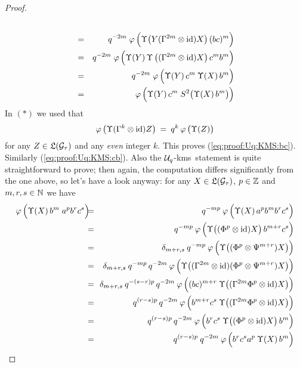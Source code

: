 \begin{proof}
\begin{eqnarray*}
\\ &=&
q^{-2m}\; \varphi\left(\Upsilon \!\left(Y (\Gamma^{2m} \tens \id) X \right) (bc)^m \vertL \right)
\\ &=&
q^{-2m}\; \varphi\left(\Upsilon(Y) \, \Upsilon
       \left((\Gamma^{2m} \tens \id) X \right) c^m b^m \vertL\right)
\\ &=&
q^{-2m}\; \varphi\left(\Upsilon(Y)\, c^m \: \Upsilon(X)\, b^m \vertL\right)
\\ &=&
\varphi\left(\Upsilon(Y)\,c^m\;
        S^2\!\left(\Upsilon(X)\,b^m \vertM \right) \! \vertL\right)
\end{eqnarray*}
In $(*)$ we used that
$$ \varphi \left(\Upsilon(\Gamma^k \tens \id)Z\vertM\right)
        \:=\: q^k \,\varphi\left(\Upsilon(Z)\vertM\right) $$
for any $Z \in \mathfrak{L}(\mathcal G_\tau)$ and any {\em even\/} integer $k$.
This proves (\ref{eq:proof:Uq:KMS:bc}). Similarly (\ref{eq:proof:Uq:KMS:cb}).
Also the ${\mathcal U}_q$-{\sc kms}\ statement is quite straight\-forward to prove;
then again, the computation differs significantly from the one above,
so let's have a look anyway:
for any $X \in \mathfrak{L}(\mathcal G_\tau)$, $p \in \mathbb{Z}$ and $m,r,s \in \mathbb{N}$ we have
\begin{eqnarray*}
\varphi\left(\Upsilon(X)\, b^m \; a^p b^r c^s \vertL \right)
\!\!\!&=\!\!&
q^{-mp} \: \varphi\left(\Upsilon(X)\, a^p b^m b^r c^s \vertL\right) \\
&=\!\!&
q^{-mp} \: \varphi\left(\Upsilon \!\left(
        (\Phi^p \tens \id)X \vertM\right) b^{m+r} c^s \vertL \right) \\
&=\!\!&
\delta_{m+r,s} \: q^{-mp} \: \varphi\left(
     \Upsilon \!\left((\Phi^p \tens \Psi^{m+r})
     X\right) \! \vertL\right) \\
&=\!\!&
\delta_{m+r,s} \: q^{-mp} \, q^{-2m} \: \varphi\left(
     \Upsilon \!\left((\Gamma^{2m} \tens \id)(\Phi^p \tens \Psi^{m+r})
     X\right) \! \vertL\right) \\
&=\!\!&
\delta_{m+r,s} \: q^{-(s-r)p} \, q^{-2m} \: \varphi\left(
    (bc)^{m+r} \:\Upsilon \!\left((\Gamma^{2m} \Phi^p \tens \id)
    X\right)\! \vertL\right)  \\
&=\!\!&
    q^{(r-s)p} \, q^{-2m} \: \varphi\left(
    b^{m+r} c^s \: \Upsilon \!\left((\Gamma^{2m} \Phi^p \tens \id)
    X\right)\! \vertL\right)  \\
&=\!\!&
    q^{(r-s)p} \, q^{-2m} \: \varphi\left(
    b^r c^s \: \Upsilon \!\left((\Phi^p \tens \id) X \vertM \right)  b^m \vertL\right)  \\
&=\!\!&
    q^{(r-s)p} \: q^{-2m} \: \varphi\left( b^r c^s a^p \: \Upsilon(X)\, b^m \vertL\right)  \\

\end{eqnarray*}
\end{proof}

